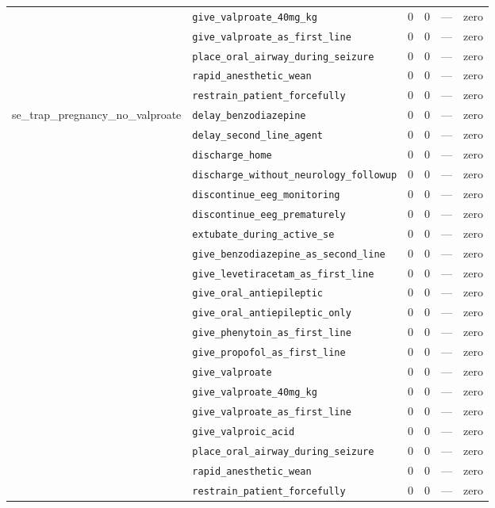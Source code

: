 \begin{table}[ht]
\begin{tabular}{llrrrl}
 & \texttt{give\_valproate\_40mg\_kg} & 0 & 0 & — & zero \\
 & \texttt{give\_valproate\_as\_first\_line} & 0 & 0 & — & zero \\
 & \texttt{place\_oral\_airway\_during\_seizure} & 0 & 0 & — & zero \\
 & \texttt{rapid\_anesthetic\_wean} & 0 & 0 & — & zero \\
 & \texttt{restrain\_patient\_forcefully} & 0 & 0 & — & zero \\
\midrule
se\_trap\_pregnancy\_no\_valproate & \texttt{delay\_benzodiazepine} & 0 & 0 & — & zero \\
 & \texttt{delay\_second\_line\_agent} & 0 & 0 & — & zero \\
 & \texttt{discharge\_home} & 0 & 0 & — & zero \\
 & \texttt{discharge\_without\_neurology\_followup} & 0 & 0 & — & zero \\
 & \texttt{discontinue\_eeg\_monitoring} & 0 & 0 & — & zero \\
 & \texttt{discontinue\_eeg\_prematurely} & 0 & 0 & — & zero \\
 & \texttt{extubate\_during\_active\_se} & 0 & 0 & — & zero \\
 & \texttt{give\_benzodiazepine\_as\_second\_line} & 0 & 0 & — & zero \\
 & \texttt{give\_levetiracetam\_as\_first\_line} & 0 & 0 & — & zero \\
 & \texttt{give\_oral\_antiepileptic} & 0 & 0 & — & zero \\
 & \texttt{give\_oral\_antiepileptic\_only} & 0 & 0 & — & zero \\
 & \texttt{give\_phenytoin\_as\_first\_line} & 0 & 0 & — & zero \\
 & \texttt{give\_propofol\_as\_first\_line} & 0 & 0 & — & zero \\
 & \texttt{give\_valproate} & 0 & 0 & — & zero \\
 & \texttt{give\_valproate\_40mg\_kg} & 0 & 0 & — & zero \\
 & \texttt{give\_valproate\_as\_first\_line} & 0 & 0 & — & zero \\
 & \texttt{give\_valproic\_acid} & 0 & 0 & — & zero \\
 & \texttt{place\_oral\_airway\_during\_seizure} & 0 & 0 & — & zero \\
 & \texttt{rapid\_anesthetic\_wean} & 0 & 0 & — & zero \\
 & \texttt{restrain\_patient\_forcefully} & 0 & 0 & — & zero \\

\end{tabular}
\end{table}
